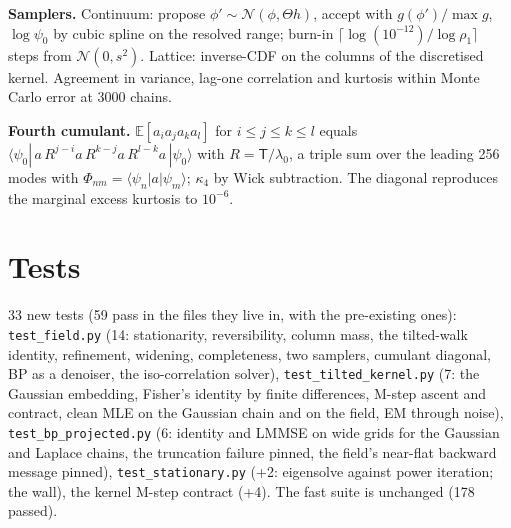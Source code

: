 \documentclass[10pt,a4paper]{article}
\newcommand{\Th}{\Theta}
\newcommand{\code}[1]{\texttt{\small #1}}
\newcommand{\st}[1]{\textbf{#1}}
\newcommand{\E}{\mathbb{E}}
\newcommand{\Nn}{\mathcal{N}}
\theoremstyle{plain}
\theoremstyle{remark}
\begin{document}
\st{Samplers.} Continuum: propose $\phi'\sim\Nn(\phi,\Th h)$, accept with $g(\phi')/\max g$, $\log\psi_0$
by cubic spline on the resolved range; burn-in $\lceil\log(10^{-12})/\log\rho_1\rceil$ steps from
$\Nn(0,s^2)$. Lattice: inverse-CDF on the columns of the discretised kernel. Agreement in variance,
lag-one correlation and kurtosis within Monte Carlo error at 3000 chains.

\st{Fourth cumulant.} $\E[a_ia_ja_ka_l]$ for $i\le j\le k\le l$ equals
$\langle\psi_0|\,a\,R^{j-i}a\,R^{k-j}a\,R^{l-k}a\,|\psi_0\rangle$ with $R=\mathsf T/\lambda_0$, a triple sum over
the leading 256 modes with $\Phi_{nm}=\langle\psi_n|a|\psi_m\rangle$; $\kappa_4$ by Wick subtraction. The
diagonal reproduces the marginal excess kurtosis to $10^{-6}$.

\section{Tests}

33 new tests (59 pass in the files they live in, with the pre-existing ones): \code{test\_field.py} (14: stationarity, reversibility, column mass, the tilted-walk
identity, refinement, widening, completeness, two samplers, cumulant diagonal, BP as a denoiser, the
iso-correlation solver), \code{test\_tilted\_kernel.py} (7: the Gaussian embedding, Fisher's identity
by finite differences, M-step ascent and contract, clean MLE on the Gaussian chain and on the field,
EM through noise), \code{test\_bp\_projected.py} (6: identity and LMMSE on wide grids for the Gaussian
and Laplace chains, the truncation failure pinned, the field's near-flat backward message pinned),
\code{test\_stationary.py} (+2: eigensolve against power iteration; the wall), the kernel M-step
contract (+4). The fast suite is unchanged (178 passed).
\end{document}
